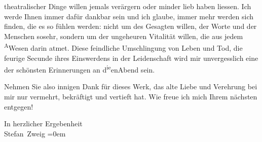                theatralischer Dinge willen jemals verärgern oder minder lieb haben liessen. Ich
               werde Ihnen immer dafür dankbar sein und ich glaube, immer mehr werden sich finden,
               die es so fühlen werden: nicht um des Gesagten willen, der Worte und der Menschen
               sosehr, sondern um der ungeheuren Vitalität willen, die aus jedem \substVorne{}\textsuperscript{A}\substDazwischen{}W\substHinten{}esen darin atmet. Diese feindliche Um{\pb}schlingung von Leben und Tod, die
               feurige Secunde ihres Einswerdens in der Leidenschaft wird mir unvergesslich eine der
               schönsten Erinnerungen an d\substVorne{}\textsuperscript{ie}\substDazwischen{}en\substHinten{}{ }Abend sein.\pend
           
\pstart
           Nehmen Sie also innigen Dank für dieses Werk, das alte Liebe und Verehrung bei mir nur vermehrt,
               bekräftigt und vertieft hat. Wie freue ich mich Ihrem nächsten entgegen!\pend
           
\pstart
           In herzlicher Ergebenheit{\\[\baselineskip]}\spacefill\mbox{Stefan Zweig}\pend
           \leftskip=0em{}\endnumbering{}  \newcommand{\dateiname}{L03624}\newcommand{\titel}{Stefan Zweig an Arthur Schnitzler, 13. 12. 1909}\newcommand{\editorInnen}{Selma Jahnke und Martin Anton Müller}
